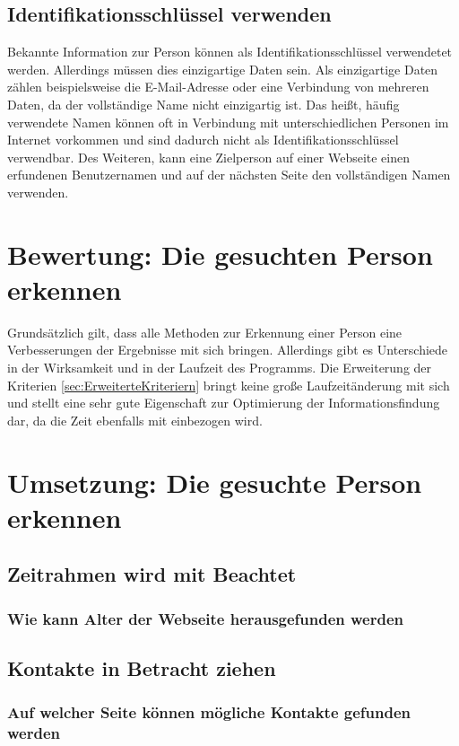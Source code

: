 	\subsection{Identifikationsschlüssel verwenden}
	Bekannte Information zur Person können als Identifikationsschlüssel verwendetet werden. Allerdings müssen dies einzigartige Daten sein. Als einzigartige Daten zählen beispielsweise die E-Mail-Adresse oder eine Verbindung von mehreren Daten, da der vollständige Name nicht einzigartig ist. Das heißt, häufig verwendete Namen können oft in Verbindung mit unterschiedlichen Personen im Internet vorkommen und sind dadurch nicht als Identifikationsschlüssel verwendbar. Des Weiteren, kann eine Zielperson auf einer Webseite einen erfundenen Benutzernamen und auf der nächsten Seite den vollständigen Namen verwenden.\\
	

	
\section{Bewertung: Die gesuchten Person erkennen}
Grundsätzlich gilt, dass alle Methoden zur Erkennung einer Person eine Verbesserungen der Ergebnisse mit sich bringen. Allerdings gibt es Unterschiede in der Wirksamkeit und in der Laufzeit des Programms.
Die Erweiterung der Kriterien \ref{sec:ErweiterteKriteriern} bringt keine große Laufzeitänderung mit sich und stellt eine sehr gute Eigenschaft zur Optimierung der Informationsfindung dar, da die Zeit ebenfalls mit einbezogen wird.
\section{Umsetzung: Die gesuchte Person erkennen}
	\subsection{Zeitrahmen wird mit Beachtet}
		\subsubsection{Wie kann Alter der Webseite herausgefunden werden}
	\subsection{Kontakte in Betracht ziehen}
		\subsubsection{Auf welcher Seite können mögliche Kontakte gefunden werden}
